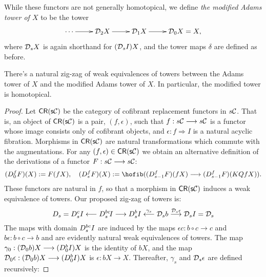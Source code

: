 \documentclass[11pt]{amsart}
\theoremstyle{plain}
\newcommand{\caldup}[1]{\calD_{\smash{#1}}}
\begin{document}
While these functors are not generally homotopical, we define \emph{the modified Adams tower of $X$} to be the tower
\[\xymatrix@R=4mm{
\cdots 
\ar[r]
&%
\caldup{2}X
\ar[r]
&%
\caldup{1}X
\ar[r]&%
\caldup{0}X=X,
}\]
where $\caldup{s}X$ is again shorthand for $(\caldup{s}I)X$, and the tower maps $\delta$ are defined as before.
\begin{prop}\label{prop:modifiedAdamsTower}
There's a natural zig-zag of weak equivalences of towers between the Adams tower of $X$ and the modified Adams tower of $X$. In particular, the modified tower is homotopical.
\end{prop}
\begin{proof}
Let $\mathsf{CR(s\calC)}$ be the category of cofibrant replacement functors in $s\calC$. That is, an object of $\mathsf{CR(s\calC)}$ is a pair, $(f,\epsilon)$, such that $f:s\calC\to s\calC$ is a functor whose image consists only of cofibrant objects, and $\epsilon:f\Rightarrow I$ is a natural acyclic fibration. Morphisms in $\mathsf{CR(s\calC)}$ are natural transformations which commute with the augmentations. For any $(f,\epsilon)\in\mathsf{CR(s\calC)}$ we obtain an alternative definition of the derivations of a functor $F:s\calC\to s\calC$:
\begin{alignat*}{2}
(D_{\smash{0}}^{\smash{f}}F)(X)
:=
F(fX),\quad %
(D_{\smash{s}}^{\smash{f}}F)(X)
:=
\hofib((D_{\smash{s-1}}^{\smash{f}}F)(fX)\to (D_{\smash{s-1}}^{\smash{f}}F)(KQfX)).
\end{alignat*}
These functors are natural in $f$, so that a morphism in $\mathsf{CR(s\calC)}$ induces a weak equivalence of towers. Our proposed zig-zag of towers is: %
\[D_{\smash{s}}= D_{\smash{s}}^{\smash{c}}I\overset{}{\from}D_{\smash{s}}^{\smash{b\circ c}}\!I\overset{}{\to}D_{\smash{s}}^{\smash{b}}I\overset{\gamma_s}{\from}\caldup{s}b\overset{\caldup{s}\epsilon}{\to}\caldup{s}I=\caldup{s}\]
The maps with domain $D_{\smash{s}}^{\smash{b\circ c}}I$ are induced by the maps $\epsilon c:b\circ c\to c$ and $b\epsilon:b\circ c\to b$ and are evidently natural weak equivalences of towers. The map $\gamma_0:(\caldup{0}b)X\to (D_{\smash{0}}^{\smash{b}}I)X$ is the identity of $bX$, and the map $\caldup{0}\epsilon:(\caldup{0}b)X\to (D_{\smash{0}}^{\smash{b}}I)X$ is $\epsilon:bX\to X$. Thereafter, $\gamma_s$ and $\caldup{s}\epsilon$ are defined recursively:

\end{proof}
\end{document}
